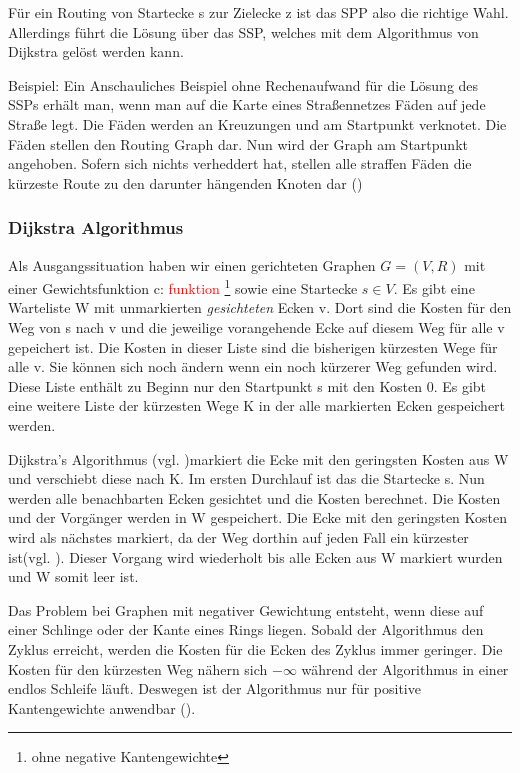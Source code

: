 \documentclass[10pt,a4paper]{article}
\newcommand\todo[1]{\textcolor{red}{#1}}
\begin{document}
Für ein Routing von Startecke s zur Zielecke z ist das SPP also die richtige Wahl. Allerdings führt die Lösung über das SSP, welches mit dem Algorithmus von Dijkstra gelöst werden kann.

Beispiel:
Ein Anschauliches Beispiel ohne Rechenaufwand für die Lösung des SSPs erhält man, wenn man auf die Karte eines Straßennetzes Fäden auf jede Straße legt. Die Fäden werden an Kreuzungen und am Startpunkt verknotet. Die Fäden stellen den Routing Graph dar. Nun wird der Graph am Startpunkt angehoben. Sofern sich nichts verheddert hat, stellen alle straffen Fäden die kürzeste Route zu den darunter hängenden Knoten dar (\cite[191]{kurt})


\subsubsection{Dijkstra Algorithmus}

Als Ausgangssituation haben wir einen gerichteten Graphen $G = (V,R)$ mit einer Gewichtsfunktion c: \todo{funktion} \footnote{ohne negative Kantengewichte} sowie eine Startecke $s \in V$. Es gibt eine Warteliste W mit unmarkierten \textit{gesichteten} Ecken v. Dort sind die Kosten für den Weg von s nach v und die jeweilige vorangehende Ecke auf diesem Weg für alle v gepeichert ist. Die Kosten in dieser Liste sind die bisherigen kürzesten Wege für alle v. Sie können sich noch ändern wenn ein noch kürzerer Weg gefunden wird. Diese Liste enthält zu Beginn nur den Startpunkt s mit den Kosten 0. Es gibt eine weitere Liste der kürzesten Wege K in der alle markierten Ecken gespeichert werden.

Dijkstra's Algorithmus (vgl. \cite{dijkstra})markiert die Ecke mit den geringsten Kosten aus W und verschiebt diese nach K. Im ersten Durchlauf ist das die Startecke s. Nun werden alle benachbarten Ecken gesichtet und die Kosten berechnet. Die Kosten und der Vorgänger werden in W gespeichert. Die Ecke mit den geringsten Kosten wird als nächstes markiert, da der Weg dorthin auf jeden Fall ein kürzester ist(vgl. \cite[197f]{kurt}).  Dieser Vorgang wird wiederholt bis alle Ecken aus W markiert wurden und W somit leer ist.

Das Problem bei Graphen mit negativer Gewichtung entsteht, wenn diese auf einer Schlinge oder der Kante eines Rings liegen. Sobald der Algorithmus den Zyklus erreicht, werden die Kosten für die Ecken des Zyklus immer geringer. Die Kosten für den kürzesten Weg nähern sich $-\infty $ während der Algorithmus in einer endlos Schleife läuft. Deswegen ist der Algorithmus nur für positive Kantengewichte anwendbar (\cite[194f]{kurt}).
\end{document}
